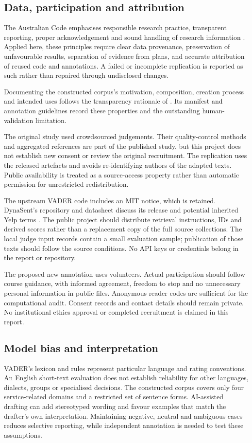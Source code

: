 \documentclass[11pt]{article}
\begin{document}
\subsection{Data, participation and attribution}
The Australian Code emphasises responsible research practice, transparent
reporting, proper acknowledgement and sound handling of research information
\citep{researchCode}. Applied here, these principles require clear data provenance,
preservation of unfavourable results, separation of evidence from plans, and
accurate attribution of reused code and annotations. A failed or incomplete
replication is reported as such rather than repaired through undisclosed changes.

Documenting the constructed corpus's motivation, composition, creation process
and intended uses follows the transparency rationale of
\citet{gebru2021datasheets}. Its manifest and annotation guidelines record these
properties and the outstanding human-validation limitation.

The original study used crowdsourced judgements. Their quality-control methods
and aggregated references are part of the published study, but this project does
not establish new consent or review the original recruitment. The replication
uses the released artefacts and avoids re-identifying authors of the adapted
texts. Public availability is treated as a source-access property rather than
automatic permission for unrestricted redistribution.

The upstream VADER code includes an MIT notice, which is retained. DynaSent's
repository and datasheet discuss its release and potential inherited Yelp terms
\citep{dynasentData}. The public project should distribute retrieval instructions,
IDs and derived scores rather than a replacement copy of the full source
collections. The local judge input records contain a small evaluation sample;
publication of those texts should follow the source conditions. No API keys or
credentials belong in the report or repository.

The proposed new annotation uses volunteers. Actual participation should follow
course guidance, with informed agreement, freedom to stop and no unnecessary
personal information in public files. Anonymous reader codes are sufficient for
the computational audit. Consent records and contact details should remain
private. No institutional ethics approval or completed recruitment is claimed in
this report.

\subsection{Model bias and interpretation}
VADER's lexicon and rules represent particular language and rating conventions.
An English short-text evaluation does not establish reliability for other
languages, dialects, groups or specialised decisions. The constructed corpus
covers only four service-related domains and a restricted set of sentence forms.
AI-assisted drafting can add stereotyped wording and favour examples that match
the drafter's own interpretation. Maintaining negative, neutral and ambiguous
cases reduces selective reporting, while independent annotation is needed to
test these assumptions.
\end{document}
